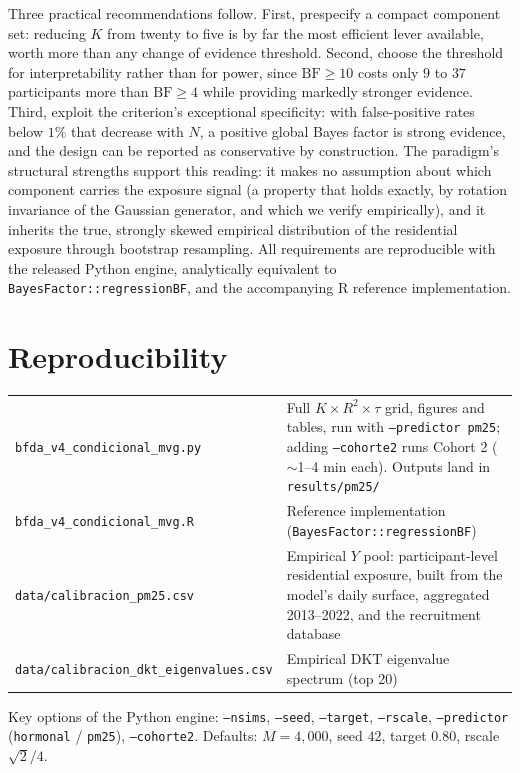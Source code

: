 \documentclass[11pt,a4paper]{article}
\newcommand{\BF}{\mathrm{BF}}
\begin{document}
Three practical recommendations follow. First, prespecify a compact component set: reducing $K$ from twenty to five is by far the most efficient lever available, worth more than any change of evidence threshold. Second, choose the threshold for interpretability rather than for power, since $\BF\ge10$ costs only $9$ to $37$ participants more than $\BF\ge4$ while providing markedly stronger evidence. Third, exploit the criterion's exceptional specificity: with false-positive rates below $1\%$ that decrease with $N$, a positive global Bayes factor is strong evidence, and the design can be reported as conservative by construction. The paradigm's structural strengths support this reading: it makes no assumption about which component carries the exposure signal (a property that holds exactly, by rotation invariance of the Gaussian generator, and which we verify empirically), and it inherits the true, strongly skewed empirical distribution of the residential exposure through bootstrap resampling. All requirements are reproducible with the released Python engine, analytically equivalent to \texttt{BayesFactor::regressionBF}, and the accompanying R reference implementation.

\section{Reproducibility}

\begin{table}[H]
\centering\small
\begin{tabular}{lp{10.2cm}}
\toprule
\texttt{bfda\_v4\_condicional\_mvg.py} & Full $K\times R^{2}\times\tau$ grid, figures and tables, run with \texttt{--predictor pm25}; adding \texttt{--cohorte2} runs Cohort 2 ($\sim$1--4 min each). Outputs land in \texttt{results/pm25/}\\
\texttt{bfda\_v4\_condicional\_mvg.R} & Reference implementation (\texttt{BayesFactor::regressionBF})\\
\texttt{data/calibracion\_pm25.csv} & Empirical $Y$ pool: participant-level residential exposure, built from the model's daily surface, aggregated 2013--2022, and the recruitment database\\
\texttt{data/calibracion\_dkt\_eigenvalues.csv} & Empirical DKT eigenvalue spectrum (top 20)\\
\bottomrule
\end{tabular}
\end{table}

Key options of the Python engine: \texttt{--nsims}, \texttt{--seed}, \texttt{--target}, \texttt{--rscale}, \texttt{--predictor} (\texttt{hormonal} / \texttt{pm25}), \texttt{--cohorte2}. Defaults: $M=4{,}000$, seed $42$, target $0.80$, rscale $\sqrt{2}/4$.
\end{document}
